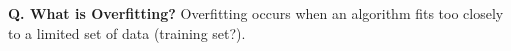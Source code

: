 \begin{frame}[fragile]{\textbf{Q. What is Overfitting?}}
  Overfitting occurs when an algorithm
  fits too closely to a limited set of data (training set?).
  \begin{columns}[T]
  \begin{column}{.58\textwidth}
\end{column}
\end{columns}
\end{frame}
